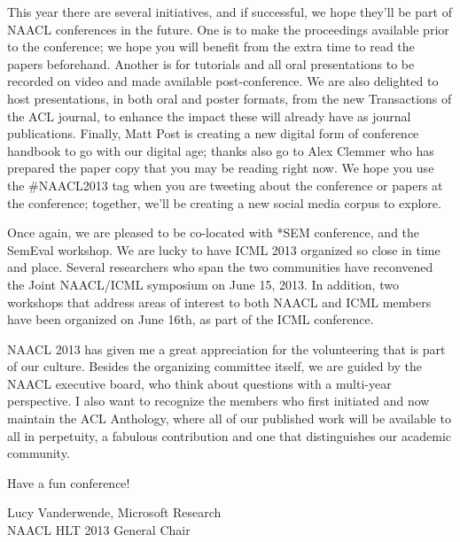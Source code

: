 This year there are several initiatives, and if successful, we hope  they’ll be part of NAACL conferences in the future. One is to make the proceedings available prior to the conference; we hope you will benefit from the extra time to read the papers beforehand.  Another is for tutorials and all oral presentations to be recorded on video and made available post-conference. We are also delighted to host presentations, in both oral and poster formats, from the new Transactions of the ACL journal, to enhance the impact these will already have as journal publications. Finally, Matt Post is creating a new digital form of conference handbook to go with our digital age; thanks also go to  Alex Clemmer who  has prepared the paper copy that you may be reading right now.  We hope you use the \#NAACL2013 tag when you are tweeting about the conference or papers at the conference; together, we'll be creating a new social media corpus to explore.

Once again, we are pleased to be co-located with *SEM conference, and the SemEval workshop. We are lucky to have ICML 2013 organized  so  close  in time and place.  Several  researchers who span the two communities have reconvened the Joint NAACL/ICML symposium on June  15, 2013. In addition, two workshops that address areas of interest to both NAACL and ICML members have been organized on June 16th, as part of the ICML conference.

NAACL 2013 has given me a great appreciation for the volunteering that is part of our culture. Besides the organizing committee itself, we are guided by the NAACL executive board, who think about questions with a multi-year perspective. I also want to recognize the members who first initiated and now maintain the ACL Anthology, where all of our published work will be available to all in perpetuity, a fabulous contribution and one that distinguishes our academic community.

Have a fun conference!

Lucy Vanderwende, Microsoft Research
\\NAACL HLT 2013 General Chair


%
